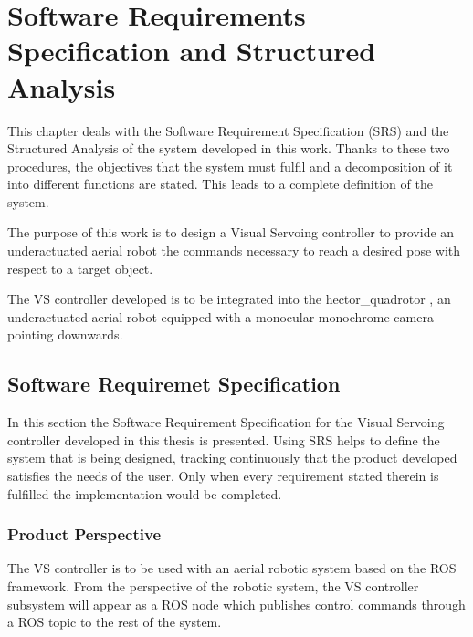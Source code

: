
\chapter{Software Requirements Specification and Structured Analysis}
\label{chap:srs-sa}

This chapter deals with the Software Requirement Specification (SRS) \cite{IEEE8301998} and the Structured Analysis \cite{SA_Braune} of the system developed in this work. Thanks to these two procedures, the objectives that the system must fulfil and a decomposition of it into different functions are stated. This leads to a complete definition of the system.


The purpose of this work is to design a Visual Servoing controller to provide an underactuated aerial robot the commands necessary to reach a desired pose with respect to a target object.

The VS controller developed is to be integrated into the hector\_quadrotor \cite{2012simpar_meyer}, an underactuated aerial robot equipped with a monocular monochrome camera pointing downwards.

\section{Software Requiremet Specification}
\label{sec:srs}

In this section the Software Requirement Specification \cite{IEEE8301998} for the Visual Servoing controller developed in this thesis is presented. Using SRS helps to define the system that is being designed, tracking continuously that the product developed satisfies the needs of the user. Only when every requirement stated therein is fulfilled the implementation would be completed.

\subsection{Product Perspective}
\label{sec:product-perspective}

The VS controller is to be used with an aerial robotic system based on the ROS framework. From the perspective of the robotic system, the VS controller subsystem will appear as a ROS node which publishes control commands through a ROS topic to the rest of the system.

